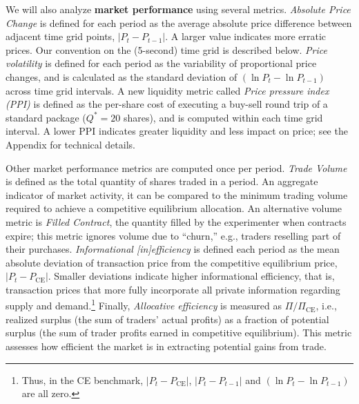 \documentclass[12pt]{article}
\begin{document}
We will also analyze \textbf{market performance} using several metrics.
\textit{Absolute Price Change} is defined for each period as the average absolute price difference between adjacent time grid points, $|P_t - P_{t-1}|$. A larger value indicates more erratic prices. 
Our convention on
the (5-second) time grid is described below. %
\textit{Price volatility} is defined for each period as the variability of proportional price changes, and is calculated as the standard deviation of $(\ln P_t - \ln P_{t-1})$ across time grid intervals.
A new liquidity metric called 
\textit{Price pressure index (PPI)} is defined as the per-share cost of executing a buy-sell round trip of a standard package ($Q^* = 20$ shares),
and is computed within each time grid interval. %
A lower PPI indicates greater liquidity and less impact on price; see the Appendix for technical details.  

Other market performance metrics are computed once per period.
\textit{Trade Volume} is defined  as the total quantity of shares traded in a period. An aggregate indicator of market activity, it can be compared to the minimum trading volume required to achieve a competitive equilibrium allocation. An alternative volume metric is \textit{Filled Contract}, the quantity filled by the experimenter when contracts expire; this metric ignores volume due to ``churn,'' e.g.,  traders reselling part of their purchases.
\textit{Informational [in]efficiency} is  defined each period as the mean absolute deviation of transaction price from the  competitive equilibrium price, \( |P_t - P_{\text{CE}}| \). 
Smaller deviations indicate higher informational efficiency, that is, transaction prices that more fully incorporate all private information regarding supply and demand.\footnote{
Thus, in the CE benchmark, \( |P_t - P_{\text{CE}}| \), $|P_t - P_{t-1}|$ and 
$(\ln P_t - \ln P_{t-1})$ are all zero.}
Finally, \textit{Allocative efficiency} is measured as \( \Pi/\Pi_{\text{CE}}\), i.e.,
 realized surplus (the sum of traders' actual profits) as a fraction of potential surplus (the sum of trader profits earned in competitive equilibrium). 
This metric assesses how efficient the market is in extracting potential gains from trade.       


\end{document}
